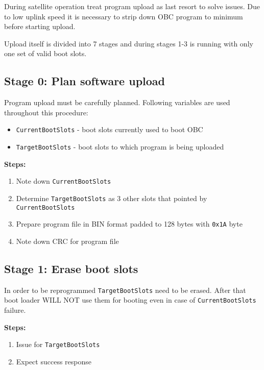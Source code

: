 \newcommand{\currentbs}{\texttt{CurrentBootSlots}}
\newcommand{\targetbs}{\texttt{TargetBootSlots}}




During satellite operation treat program upload as last resort to solve issues. Due to low uplink speed it is necessary to strip down OBC program to minimum before starting upload. 

Upload itself is divided into 7 stages and during stages 1-3 is running with only one set of valid boot slots.

\subsection{Stage 0: Plan software upload}
Program upload must be carefully planned. Following variables are used throughout this procedure:

\begin{itemize}
	\item \currentbs{} - boot slots currently used to boot OBC
	\item \targetbs{} - boot slots to which program is being uploaded
\end{itemize}

\textbf{Steps:}
\begin{enumerate}
	\item Note down \currentbs{}
	\item Determine \targetbs{} as 3 other slots that pointed by \currentbs{}
	\item Prepare program file in BIN format padded to 128 bytes with \texttt{0x1A} byte
	\item Note down CRC for program file
\end{enumerate}

\subsection{Stage 1: Erase boot slots}
In order to be reprogrammed \targetbs{} need to be erased. After that boot loader WILL NOT use them for booting even in case of \currentbs{} failure.


\textbf{Steps:}
\begin{enumerate}
	\item Issue  for \targetbs{}
	\item Expect success response
\end{enumerate}

